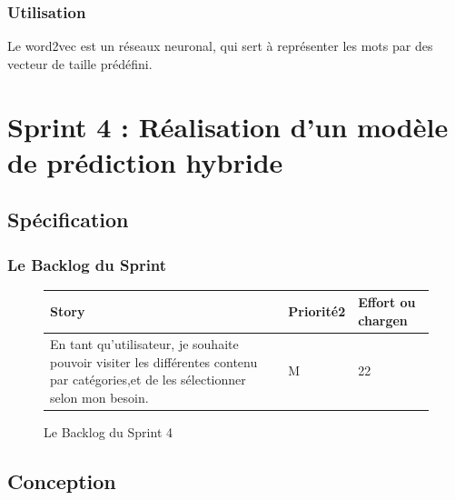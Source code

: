 \subsection{Utilisation}
Le word2vec est un réseaux neuronal, qui sert à représenter les mots par des vecteur de taille prédéfini. 



\chapter{Sprint 4 : Réalisation d’un modèle de prédiction hybride}
\label{Chapitre 7} %



\section{Spécification}
\subsection{Le Backlog du Sprint}
\begin{figure}[H]
\begin{tabular}{|p{7cm}|p{4cm}|p{4cm}|}
\hline
\textbf{Story} & \textbf{Priorité2 } & \textbf{Effort ou chargen} \\
\hline
En tant qu'utilisateur, je souhaite pouvoir visiter les différentes contenu par catégories,et de les sélectionner selon mon besoin. & \begin{center}M\end{center} & \begin{center}22\end{center}\\
\hline
\end{tabular}
  \caption{Le Backlog du Sprint 4}
  \label{fig:Backlog4}
\end{figure}
\section{Conception}
